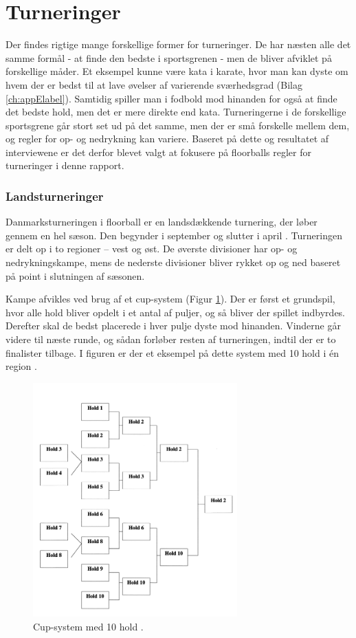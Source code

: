 \section{Turneringer}
Der findes rigtige mange forskellige former for turneringer. De har næsten alle det samme formål - at finde den bedste i sportsgrenen - men de bliver afviklet på forskellige måder. Et eksempel kunne være kata i karate, hvor man kan dyste om hvem der er bedst til at lave øvelser af varierende sværhedsgrad (Bilag \ref{ch:appElabel}). Samtidig spiller man i fodbold mod hinanden for også at finde det bedste hold, men det er mere direkte end kata. Turneringerne i de forskellige sportsgrene går stort set ud på det samme, men der er små forskelle mellem dem, og regler for op- og nedrykning kan variere. Baseret på dette og resultatet af interviewene er det derfor blevet valgt at fokusere på floorballs regler for turneringer i denne rapport.

\subsubsection{Landsturneringer}
Danmarksturneringen i floorball er en landsdækkende turnering, der løber gennem en hel sæson. Den begynder i september og slutter i april \cite{Landsturnering}. Turneringen er delt op i to regioner – vest og øst. De øverste divisioner har op- og nedrykningskampe, mens de nederste divisioner bliver rykket op og ned baseret på point i slutningen af sæsonen.
\par
Kampe afvikles ved brug af et cup-system (Figur \ref{fig:cup-spil}). Der er først et grundspil, hvor alle hold bliver opdelt i et antal af puljer, og så bliver der spillet indbyrdes. Derefter skal de bedst placerede i hver pulje dyste mod hinanden. Vinderne går videre til næste runde, og sådan forløber resten af turneringen, indtil der er to finalister tilbage. I figuren er der et eksempel på dette system med 10 hold i én region \cite{Unihoc}\cite{Landsturnering}.

\begin{figure}[H]
  \centering
  \includegraphics[width=0.7\textwidth]{figures/cup-spil.png}
  \caption{Cup-system med 10 hold 
  \citep{staevnemappe}. }
  \label{fig:cup-spil}
\end{figure}

